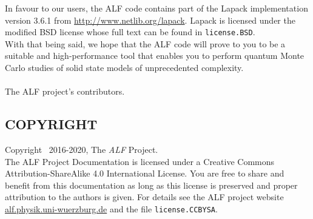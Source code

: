 In favour to our users, the ALF code contains part of the Lapack implementation version 3.6.1 from \url{http://www.netlib.org/lapack}.
Lapack is licensed under the modified BSD license whose full text can be found in \texttt{license.BSD}.\\
With that being said, we hope that the ALF code will prove to you to be a suitable and high-performance tool that enables
you to perform quantum Monte Carlo studies of solid state models of unprecedented complexity.\\
\\
The ALF project's contributors.\\
                        
\subsection*{COPYRIGHT}

Copyright \textcopyright ~2016-2020, The \textit{ALF} Project.\\
The ALF Project Documentation 
is licensed under a Creative Commons Attribution-ShareAlike 4.0 International License.
You are free to share and benefit from this documentation as long as this license is preserved and proper attribution to the authors is given. For details see the ALF project website \url{alf.physik.uni-wuerzburg.de} and the file \texttt{license.CCBYSA}.
